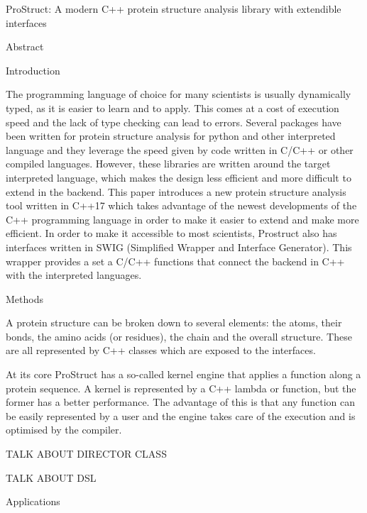 ProStruct: A modern C++ protein structure analysis library with extendible interfaces

Abstract


Introduction

The programming language of choice for many scientists is usually dynamically typed, as it 
is easier to learn and to apply. This comes at a cost of execution speed and the lack
of type checking can lead to errors. Several packages have been written for protein
structure analysis for python and other interpreted language and they leverage 
the speed given by code written in C/C++ or other compiled languages. However, these
libraries are written around the target interpreted language, which makes the design
less efficient and more difficult to extend in the backend. 
This paper introduces a new protein structure analysis tool written in C++17 which takes
advantage of the newest developments of the C++ programming language in order to make it easier
to extend and make more efficient. In order to make it accessible to most scientists, Prostruct
also has interfaces written in SWIG (Simplified Wrapper and Interface Generator). This wrapper
provides a set a C/C++ functions that connect the backend in C++ with the interpreted languages.

Methods

A protein structure can be broken down to several elements: the atoms, their bonds, the amino acids 
(or residues), the chain and the overall structure. These are all represented by C++ classes
which are exposed to the interfaces. 

At its core ProStruct has a so-called kernel engine that applies a function along a protein sequence.
A kernel is represented by a C++ lambda or function, but the former has a better performance. The advantage
of this is that any function can be easily represented by a user and the engine takes care of 
the execution and is optimised by the compiler.

TALK ABOUT DIRECTOR CLASS

TALK ABOUT DSL

Applications

